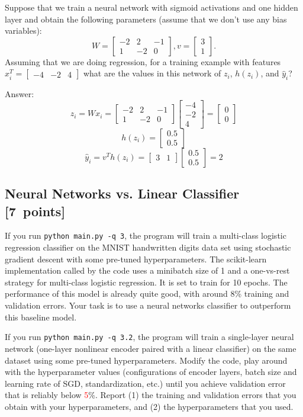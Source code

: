 \documentclass{article}
\newcommand{\blu}[1]{{\textcolor{blu}{#1}}}
\newcommand{\red}[1]{\textcolor{red}{#1}}
\newenvironment{answer}{\par\begingroup\color{gre}Answer: }{\endgroup}
\let\ask\blu
\newcommand\pts[1]{\textcolor{pointscolour}{[#1~points]}}
\newcommand{\mat}[1]{\begin{bmatrix}#1\end{bmatrix}}
\begin{document}
Suppose that we train a neural network with sigmoid activations and one hidden layer and obtain the following parameters (assume that we don't use any bias variables):
\[
W = \mat{-2 & 2 & -1\\1 & -2 & 0}, v = \mat{3 \\1}.
\]
Assuming that we are doing regression, \ask{for a training example with features $x_i^T = \mat{-4 &-2 & 4}$ what are the values in this network of $z_i$, $h(z_i)$, and $\hat{y}_i$?}
\begin{answer}
	\begin{equation*}
		z_i = W x_i = \mat{-2 & 2 & -1\\1 & -2 & 0} \mat{-4\\-2\\4} = \mat{0\\0}
	\end{equation*}
	\begin{equation*}
		h(z_i) = \mat{0.5 \\ 0.5}
	\end{equation*}
	\begin{equation*}
		\hat{y}_i = v^T h(z_i) = \mat{3 & 1} \mat{0.5 \\ 0.5} = 2
	\end{equation*}
\end{answer}

\subsection{Neural Networks vs. Linear Classifier \pts{7}}


If you run \texttt{python main.py -q 3}, the program will train a multi-class logistic regression classifier on the MNIST handwritten digits data set using stochastic gradient descent with some pre-tuned hyperparameters.
The scikit-learn implementation called by the code uses a minibatch size of 1 and a one-vs-rest strategy for multi-class logistic regression. It is set to train for 10 epochs.
The performance of this model is already quite good, with around 8\% training and validation errors. Your task is to use a neural networks classifier to outperform this baseline model.

If you run \texttt{python main.py -q 3.2}, the program will train a single-layer neural network (one-layer nonlinear encoder paired with a linear classifier) on the same dataset using some pre-tuned hyperparameters. Modify the code, play around with the hyperparameter values (configurations of encoder layers, batch size and learning rate of SGD, standardization, etc.) until you achieve validation error that is reliably below \red{5}\%. \ask{Report (1) the training and validation errors that you obtain with your hyperparameters, and (2) the hyperparameters that you used.}
\end{document}
